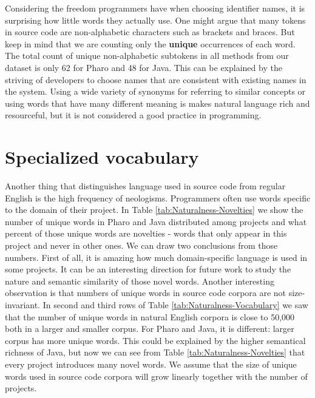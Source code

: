 Considering the freedom programmers have when choosing identifier names, it is surprising how little words they actually use. One might argue that many tokens in source code are non-alphabetic characters such as brackets and braces. But keep in mind that we are counting only the \textbf{unique} occurrences of each word. The total count of unique non-alphabetic subtokens in all methods from our dataset is only 62 for Pharo and 48 for Java. This can be explained by the striving of developers to choose names that are consistent with existing names in the system. Using a wide variety of synonyms for referring to similar concepts or using words that have many different meaning is makes natural language rich and resourceful, but it is not considered a good practice in programming.

\section{Specialized vocabulary}
\label{sec:Naturalness-SpecializedVocabulary}

Another thing that distinguishes language used in source code from regular English is the high frequency of neologisms. Programmers often use words specific to the domain of their project. In Table \ref{tab:Naturalness-Novelties} we show the number of unique words in Pharo and Java distributed among projects and what percent of those unique words are novelties - words that only appear in this project and never in other ones. We can draw two conclusions from those numbers. First of all, it is amazing how much domain-specific language is used in some projects. It can be an interesting direction for future work to study the nature and semantic similarity of those novel words. Another interesting observation is that numbers of unique words in source code corpora are not size-invariant. In second and third rows of Table \ref{tab:Naturalness-Vocabulary} we saw that the number of unique words in natural English corpora is close to 50,000 both in a larger and smaller corpus. For Pharo and Java, it is different: larger corpus has more unique words. This could be explained by the higher semantical richness of Java, but now we can see from Table \ref{tab:Naturalness-Novelties} that every project introduces many novel words. We assume that the size of unique words used in source code corpora will grow linearly together with the number of projects.

